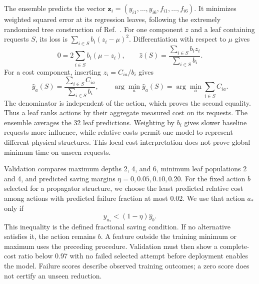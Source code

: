 \documentclass[11pt,a4paper]{article}
\begin{document}
The ensemble predicts the vector $\boldsymbol z_i=(y_{i1},\ldots,y_{i6},f_{i1},\ldots,f_{i6})$. It minimizes weighted squared error at its regression leaves, following the extremely randomized tree construction of Ref.~\cite{Geurts2006ExtraTrees}. For one component $z$ and a leaf containing requests $S$, its loss is $\sum_{i\in S}b_i(z_i-\mu)^2$. Differentiation with respect to $\mu$ gives
\begin{equation}
 0=2\sum_{i\in S}b_i(\mu-z_i),\qquad
 \widehat z(S)=\frac{\sum_{i\in S}b_i z_i}{\sum_{i\in S}b_i}.
 \label{notes-reconstruction-eq:reconstruction-leaf}
\end{equation}
For a cost component, inserting $z_i=C_{ia}/b_i$ gives
\begin{equation}
 \widehat y_a(S)=\frac{\sum_{i\in S}C_{ia}}{\sum_{i\in S}b_i},
 \qquad
 \arg\min_a\widehat y_a(S)=\arg\min_a\sum_{i\in S}C_{ia}.
 \label{notes-reconstruction-eq:reconstruction-leaf-choice}
\end{equation}
The denominator is independent of the action, which proves the second equality. Thus a leaf ranks actions by their aggregate measured cost on its requests. The ensemble averages the 32 leaf predictions. Weighting by $b_i$ gives slower baseline requests more influence, while relative costs permit one model to represent different physical structures. This local cost interpretation does not prove global minimum time on unseen requests.

Validation compares maximum depths 2, 4, and 6, minimum leaf populations 2 and 4, and predicted saving margins $\eta=0,0.05,0.10,0.20$. For the fixed action $b$ selected for a propagator structure, we choose the least predicted relative cost among actions with predicted failure fraction at most 0.02. We use that action $a_*$ only if
\begin{equation}
 \widehat y_{a_*}<(1-\eta)\widehat y_b.
 \label{notes-reconstruction-eq:reconstruction-margin}
\end{equation}
This inequality is the defined fractional saving condition. If no alternative satisfies it, the action remains $b$. A feature outside the training minimum or maximum uses the preceding procedure. Validation must then show a complete-cost ratio below 0.97 with no failed selected attempt before deployment enables the model. Failure scores describe observed training outcomes; a zero score does not certify an unseen reduction.
\end{document}
